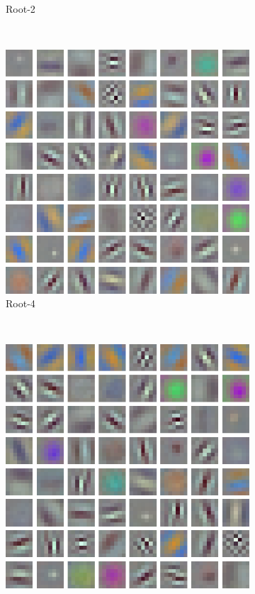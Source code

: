 \documentclass[thesis]{subfiles}
\begin{document}
\begin{figure}[tb]
\begin{subfigure}[b]{0.45\textwidth}
			\caption{Root-2}
			\label{fig:resnet50root2conv0}
		\end{subfigure}
		~
		\begin{subfigure}[b]{0.45\textwidth}
			\centering
			\includegraphics[width=\textwidth]{Figs/Raster/msrc-resnet-50-conv1-root8-convonly}
			\caption{Root-4}
			\label{fig:resnet50root4conv0}
		\end{subfigure}
		~
		\begin{subfigure}[b]{0.45\textwidth}
			\centering
			\includegraphics[width=\textwidth]{Figs/Raster/msrc-resnet-50-conv1-root16-convonly}

\end{subfigure}
\end{figure}
\end{document}
